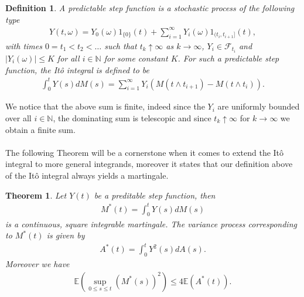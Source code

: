 \documentclass[11pt,a4paper, final]{article}
\newtheorem{thm}{Theorem}[section]
\newtheorem{defn}{Definition}[section]
\begin{document}
\begin{defn} \label{defitopredictable} A predictable step function is a stochastic process of the following type
\begin{align*}
Y(t, \omega) = Y_0 ( \omega)1_{\{0\}} (t) + \sum_{i=1}^\infty Y_i( \omega) 1_{(t_i,t_{i+1}]}(t),
\end{align*}
with times $0=t_1 < t_2 < \dots $ such that $t_k \uparrow \infty$ as $k \to \infty$, $Y_i \in \mathcal{F}_{t_i}$ and $|Y_i( \omega)| \leq K$ for all $i \in \mathbb{N}$ for some constant $K$. 
For such a predictable step function, the Itô integral is defined to be 
\begin{align*}
\int_0^t Y(s) dM(s) = \sum_{i=1}^\infty Y_i  (M(t \wedge t_{i+1}) - M(t \wedge t_i)).
\end{align*}
\end{defn}
\noindent We notice that the above sum is finite, indeed since the $Y_i$ are uniformly bounded over all $i \in \mathbb{N}$, the dominating sum is telescopic and since $t_k \uparrow \infty$ for $k \to \infty$ we obtain a finite sum.
\\
\\
The following Theorem will be a cornerstone when it comes to extend the Itô integral to more general integrands, moreover it states that our definition above of the Itô integral always yields a martingale.
\newpage
\begin{thm} \label{thminequalty} Let $Y(t)$ be a preditable step function, then
\begin{align*}
M^*(t) = \int_0^t Y(s) dM(s)
\end{align*}
is a continuous, square integrable martingale. The variance process corresponding to $M^*(t)$ is given by
\begin{align*}
A^*(t) = \int_0^t Y^2(s) dA(s).
\end{align*}
Moreover we have
\begin{align*}
\mathbb{E}\left( \sup_{0 \leq s \leq t} (M^*(s))^2 \right) \leq 4 \mathbb{E}(A^*(t)).
\end{align*}
\end{thm}
\end{document}
